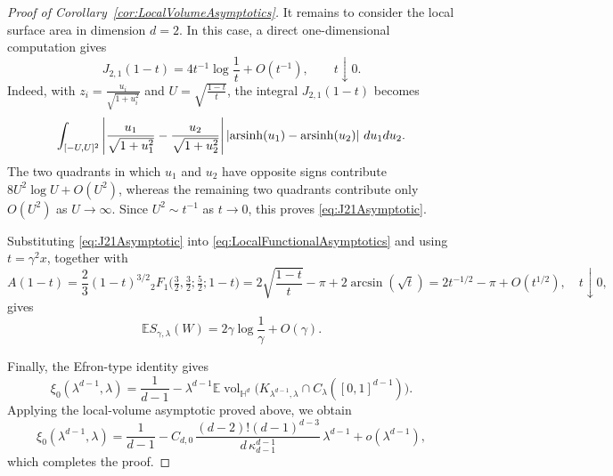 \documentclass[10pt,a4paper]{amsart}
\def\EE{\mathbb{E}}
\def\HH{\mathbb{H}}
\newcommand{\dint}{\textup{d}}
\newcommand{\vol}{\mathop{\mathrm{vol}}\nolimits}
\begin{document}
\begin{proof}[Proof of Corollary~\ref{cor:LocalVolumeAsymptotics}]
	It remains to consider the local surface area in dimension $d=2$. In
	this case, a direct one-dimensional computation gives
	\begin{equation}\label{eq:J21Asymptotic}
		J_{2,1}(1-t)
		=
		4t^{-1}\log\frac{1}{t}
		+
		O(t^{-1}),
		\qquad t\downarrow0.
	\end{equation}
	Indeed, with $z_i=\frac{u_i}{\sqrt{1+u_i^2}}$ and $U=\sqrt{\frac{1-t}{t}}$,
	the integral $J_{2,1}(1-t)$ becomes
	\[
		\int_{[-U,U]^2}
		\left|
		\frac{u_1}{\sqrt{1+u_1^2}}
		-
		\frac{u_2}{\sqrt{1+u_2^2}}
		\right|
		\left|
		\operatorname{arsinh}(u_1)
		-
		\operatorname{arsinh}(u_2)
		\right|
		\,\dint u_1\dint u_2.
	\]
	The two quadrants in which $u_1$ and $u_2$ have opposite signs
	contribute
	$8U^2\log U+O(U^2)$, whereas the remaining two quadrants contribute
	only $O(U^2)$ as $U\to\infty$. Since $U^2\sim t^{-1}$ as $t\to 0$, this proves
	\eqref{eq:J21Asymptotic}.

	Substituting \eqref{eq:J21Asymptotic} into
	\eqref{eq:LocalFunctionalAsymptotics} and using
	$t=\gamma^2x$, together with
	\[
		A(1-t)=\frac{2}{3}(1-t)^{3/2}{}_2F_1\!\Big(\tfrac32,\tfrac32;\tfrac52;1-t\Big)
		=2\sqrt{\frac{1-t}{t}}-\pi+2\arcsin(\sqrt{t})
		=
		2t^{-1/2}-\pi+O(t^{1/2}),
		\quad t\downarrow0,
	\]
	gives
	\[
		\EE S_{\gamma,\lambda}(W)
		=
		2\gamma\log\frac{1}{\gamma}
		+
		O(\gamma).
	\]

	Finally, the Efron-type identity gives
	\[
		\xi_0(\lambda^{d-1},\lambda)
		=
		\frac{1}{d-1}
		-
		\lambda^{d-1}
		\EE\vol_{\HH^d}\bigl(
		K_{\lambda^{d-1},\lambda}
		\cap C_\lambda([0,1]^{d-1})
		\bigr).
	\]
	Applying the local-volume asymptotic proved above, we obtain
	\[
		\xi_0(\lambda^{d-1},\lambda)
		=
		\frac{1}{d-1}
		-
		C_{d,0}\,
		\frac{(d-2)!(d-1)^{d-3}}{d\,\kappa_{d-1}^{d-1}}\,
		\lambda^{d-1}
		+
		o(\lambda^{d-1}),
	\]
	which completes the proof.
\end{proof}
\end{document}

